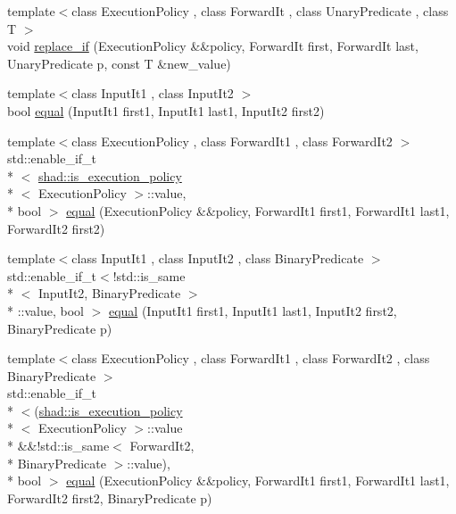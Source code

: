 \begin{DoxyCompactItemize}
\item 
{\footnotesize template$<$class Execution\-Policy , class Forward\-It , class Unary\-Predicate , class T $>$ }\\void \hyperlink{namespaceshad_aef6165d38034e9fd6e2fa8bb433a6f61}{replace\-\_\-if} (Execution\-Policy \&\&policy, Forward\-It first, Forward\-It last, Unary\-Predicate p, const T \&new\-\_\-value)
\item 
{\footnotesize template$<$class Input\-It1 , class Input\-It2 $>$ }\\bool \hyperlink{namespaceshad_a8141e857a877c6eb44095a7578281ecd}{equal} (Input\-It1 first1, Input\-It1 last1, Input\-It2 first2)
\item 
{\footnotesize template$<$class Execution\-Policy , class Forward\-It1 , class Forward\-It2 $>$ }\\std\-::enable\-\_\-if\-\_\-t\\*
$<$ \hyperlink{structshad_1_1is__execution__policy}{shad\-::is\-\_\-execution\-\_\-policy}\\*
$<$ Execution\-Policy $>$\-::value, \\*
bool $>$ \hyperlink{namespaceshad_ad909faa4c50e8fe776668cd39e776602}{equal} (Execution\-Policy \&\&policy, Forward\-It1 first1, Forward\-It1 last1, Forward\-It2 first2)
\item 
{\footnotesize template$<$class Input\-It1 , class Input\-It2 , class Binary\-Predicate $>$ }\\std\-::enable\-\_\-if\-\_\-t$<$!std\-::is\-\_\-same\\*
$<$ Input\-It2, Binary\-Predicate $>$\\*
\-::value, bool $>$ \hyperlink{namespaceshad_a9be869b9241eafbec6af016a45fa8f45}{equal} (Input\-It1 first1, Input\-It1 last1, Input\-It2 first2, Binary\-Predicate p)
\item 
{\footnotesize template$<$class Execution\-Policy , class Forward\-It1 , class Forward\-It2 , class Binary\-Predicate $>$ }\\std\-::enable\-\_\-if\-\_\-t\\*
$<$(\hyperlink{structshad_1_1is__execution__policy}{shad\-::is\-\_\-execution\-\_\-policy}\\*
$<$ Execution\-Policy $>$\-::value \\*
\&\&!std\-::is\-\_\-same$<$ Forward\-It2, \\*
Binary\-Predicate $>$\-::value), \\*
bool $>$ \hyperlink{namespaceshad_a1d99da6ce33f2013b3ff47b9a05a0916}{equal} (Execution\-Policy \&\&policy, Forward\-It1 first1, Forward\-It1 last1, Forward\-It2 first2, Binary\-Predicate p)

\end{DoxyCompactItemize}

